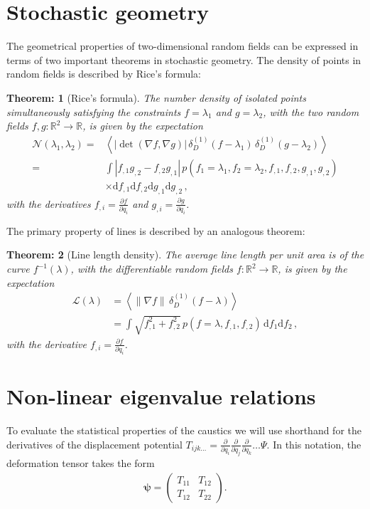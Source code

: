 \documentclass[a4paper, 11pt]{article}
\newtheorem{thr}{Theorem:}
\begin{document}
\section{Stochastic geometry}\label{ap:stochasticGeometry}
The geometrical properties of two-dimensional random fields can be expressed in terms of two important theorems in stochastic geometry. The density of points in random fields is described by Rice's formula:

\begin{thr}[Rice's formula]
The number density of isolated points simultaneously satisfying the constraints $f=\lambda_1$ and $g=\lambda_2$, with the two random fields $f,g:\mathbb{R}^2\to \mathbb{R}$, is given by the expectation 
\begin{align}
\mathcal{N}(\lambda_1,\lambda_2)=& \left \langle \left|\det (\nabla f, \nabla g)\right|\, \delta_D^{(1)}(f - \lambda_1)\, \delta_D^{(1)}(g - \lambda_2)\right\rangle\nonumber \\
=& \int |f_{,1}g_{,2}-f_{,2}g_{,1}|\, p(f_1=\lambda_1,f_2=\lambda_2,f_{,1},f_{,2},g_{,1},g_{,2})\nonumber \\
&\times\mathrm{d}f_{,1}\mathrm{d}f_{,2}\mathrm{d}g_{,1}\mathrm{d}g_{,2}\,,
\end{align}
with the derivatives $f_{,i}=\frac{\partial f}{\partial q_i}$ and $g_{,i}=\frac{\partial g}{\partial q_i}$.
\end{thr}
The primary property of lines is described by an analogous theorem:
\begin{thr}[Line length density]
The average line length per unit area is of the curve $f^{-1}(\lambda)$, with the differentiable random fields $f:\mathbb{R}^2\to \mathbb{R}$, is given by the expectation 
\begin{align}
\mathcal{L}(\lambda) &=\left\langle \|\nabla f\|\, \delta_D^{(1)}(f-\lambda)\right\rangle \nonumber \\
&= \int \sqrt{f_{,1}^2+f_{,2}^2}\, p(f=\lambda,f_{,1},f_{,2})\, \mathrm{d}f_1 \mathrm{d}f_2\,,
\end{align}
with the derivative $f_{,i}=\frac{\partial f}{\partial q_i}$.
\end{thr}







\section{Non-linear eigenvalue relations}\label{ap:eigenvalueRel}
To evaluate the statistical properties of the caustics we will use shorthand for the derivatives of the displacement potential $T_{ijk\dots} = \frac{\partial}{\partial q_i}\frac{\partial}{\partial q_j}\frac{\partial}{\partial q_k}\dots \Psi$. In this notation, the deformation tensor takes the form
\begin{align}
\bm{\psi} = \begin{pmatrix} T_{11} & T_{12} \\ T_{12} & T_{22}\end{pmatrix}.
\end{align}
\end{document}
